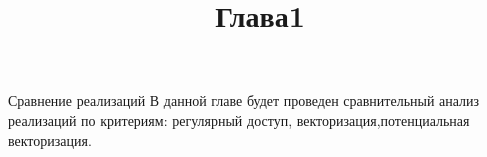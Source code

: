 
\title{Глава1}

\chaptername{ Сравнение реализаций}
В данной главе будет проведен сравнительный анализ реализаций по критериям: регулярный доступ, векторизация,потенциальная векторизация.
